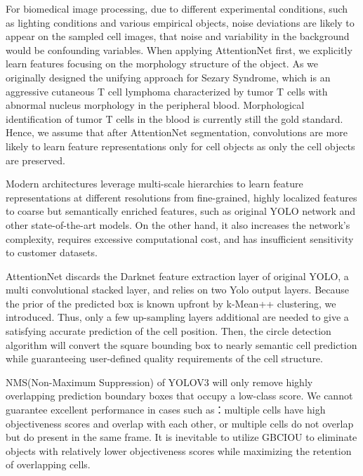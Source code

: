 For biomedical image processing, due to different experimental conditions, such as lighting conditions and various empirical objects, noise deviations are likely to appear on the sampled cell images\cite{6}\cite{7}, that noise and variability in the background would be confounding variables.
When applying AttentionNet first, we explicitly learn features focusing on the morphology structure of the object. As we originally designed the unifying approach for Sezary Syndrome, which is an aggressive cutaneous T cell lymphoma characterized by tumor T cells with abnormal nucleus morphology in the peripheral blood. Morphological identification of tumor T cells in the blood is currently still the gold standard.
Hence, we assume that after AttentionNet segmentation, convolutions are more likely to learn feature representations only for cell objects as only the cell objects are preserved.

Modern architectures leverage multi-scale hierarchies to learn feature representations at different resolutions from fine-grained, highly localized features to coarse but semantically enriched features, such as original YOLO network and other state-of-the-art models. On the other hand, it also increases the network's complexity, requires excessive computational cost, and has insufficient sensitivity to customer datasets.

AttentionNet discards the Darknet feature extraction layer of original YOLO, a multi convolutional stacked layer, and relies on two Yolo output layers. Because the prior of the predicted box is known upfront by k-Mean++ clustering, we introduced. Thus, only a few up-sampling layers additional are needed to give a satisfying accurate prediction of the cell position. Then, the circle detection algorithm will convert the square bounding box to nearly semantic cell prediction while guaranteeing user-defined quality requirements of the cell structure.

NMS(Non-Maximum Suppression) of YOLOV3 will only remove highly overlapping prediction boundary boxes that occupy a low-class score. We cannot guarantee excellent performance in cases such as：multiple cells have high objectiveness scores and overlap with each other, or multiple cells do not overlap but do present in the same frame. It is inevitable to utilize GBCIOU to eliminate objects with relatively lower objectiveness scores while maximizing the retention of overlapping cells.

